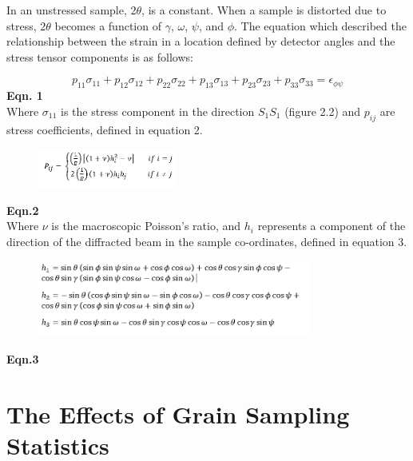 In an unstressed sample, 2$\theta$, is a constant. When a sample is distorted due to stress, 2$\theta$ becomes a function of $\gamma$, $\omega$, $\psi$, and $\phi$. The equation which described the relationship between the strain in a location defined by detector angles and the stress tensor components is as follows: \cite{he_2018_twodimensional}

$$p_{11}\sigma_{11} + p_{12}\sigma_{12}+ p_{22}\sigma_{22}+ p_{13}\sigma_{13}+ p_{23}\sigma_{23}+ p_{33}\sigma_{33} =  \epsilon_{\phi\psi}
$$ \hfill {\bf{Eqn. 1} } \\

Where $\sigma_{11}$ is the stress component in the direction $S_{1}S_{1}$ (figure 2.2) and $p_{ij}$ are stress coefficients, defined in equation 2.\cite{he_2018_twodimensional} 

 \begin{figure}[H]
 	\centering
 	\includegraphics[width=0.4\textwidth]{chapters/chapter01/fig01/pij.png}
 \end{figure}
\hfill{ \bf{Eqn.2}}\\

Where $\nu$ is the macroscopic Poisson’s ratio, and $h_{i}$ represents a component of the direction of the diffracted beam in the sample co-ordinates, defined in equation 3. \cite{he_2018_twodimensional}

 \begin{figure}[H]
 	\centering
 	\includegraphics[width=0.8\textwidth]{chapters/chapter01/fig01/h.png}
 \end{figure}
\hfill{ \bf{Eqn.3}}\\

\section{The Effects of Grain Sampling Statistics}
\label{sec:sec01}

